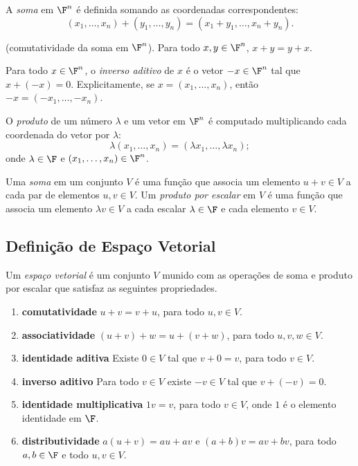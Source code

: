 \documentclass{article}
\begin{document}
\begin{defn}
    A \emph{soma} em \(\F^n\) é definida somando as coordenadas correspondentes:
    \[
        (x_1, \ldots, x_n) + (y_1, \ldots, y_n) = (x_1 + y_1, \ldots, x_n + y_n).
    \]
\end{defn}

\begin{prop} (comutatividade da soma em \(\F^n\)).
    Para todo \(x, y \in \F^n\), \(x + y = y + x\).
\end{prop}

\begin{defn}
    Para todo \(x \in \F^n\), o \emph{inverso aditivo} de \(x\) é o vetor \(-x \in \F^n\) tal que \(x + (-x) = 0\). Explicitamente, se \(x = (x_1, \ldots, x_n)\), então \(-x = (-x_1, \ldots, -x_n)\).
\end{defn}

\begin{defn}
    O \emph{produto} de um número \(\lambda\) e um vetor em \(\F^n\) é computado multiplicando cada coordenada do vetor por \(\lambda\):
    \[
        \lambda (x_1, \ldots, x_n) = (\lambda x_1, \ldots, \lambda x_n);
    \]
    \noindent onde \(\lambda \in \F\) e \((x_1, \ldots, x_n) \in \F^n\).
\end{defn}

\begin{defn}
    Uma \emph{soma} em um conjunto \(V\) é uma função que associa um elemento \(u + v \in V\) a cada par de elementos \(u, v \in V\). Um \emph{produto por escalar} em \(V\) é uma função que associa um elemento \(\lambda v \in V\) a cada escalar \(\lambda \in \F\) e cada elemento \(v \in V\). 
\end{defn}

\subsection{Definição de Espaço Vetorial}
\begin{defn}
    Um \emph{espaço vetorial} é um conjunto \(V\) munido com as operações de soma e produto por escalar que satisfaz as seguintes propriedades.
    \begin{enumerate}
        \item[(A1)] \textbf{comutatividade} \(u + v = v + u\), para todo \(u, v \in V\).
        \item[(A2)] \textbf{associatividade} \((u + v) + w = u + (v + w)\), para todo \(u, v, w \in V\).
        \item[(A3)] \textbf{identidade aditiva} Existe \(0 \in V\) tal que \(v + 0 = v\), para todo \(v \in V\).
        \item[(A4)] \textbf{inverso aditivo} Para todo \(v \in V\) existe \(-v \in V\) tal que \(v + (-v) = 0\).
        \item[(A5)] \textbf{identidade multiplicativa} \(1v = v\), para todo \(v \in V\), onde \(1\) é o elemento identidade em \(\F\).
        \item[(A6)] \textbf{distributividade} \(a(u + v) = au + av\) e \((a+b)v=av + bv\), para todo \(a, b \in \F\) e todo \(u, v \in V\).
    \end{enumerate}
\end{defn}
\end{document}
